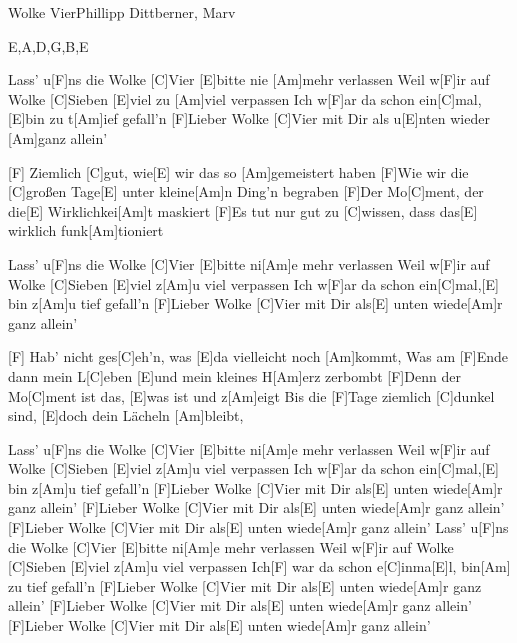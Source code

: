\documentclass[../main.tex]{subfiles}
\begin{document}
\begin{song}[4]{Wolke Vier}{Phillipp Dittberner, Marv}{}
\begin{tabline}{4}{6}{8}{E,A,D,G,B,E}
		\nextbar
		
		\nextbar
		
		\nextbar
		
		\nextbar
\end{tabline}


Lass' u[F]ns die Wolke [C]Vier [E]bitte nie [Am]mehr verlassen
Weil w[F]ir auf Wolke [C]Sieben [E]viel zu [Am]viel verpassen
Ich w[F]ar da schon ein[C]mal, [E]bin zu t[Am]ief gefall'n
[F]Lieber Wolke [C]Vier mit Dir als u[E]nten wieder [Am]ganz allein'

[F] \hh [C] \hh [E] \hh [Am] \hh
[F]Ziemlich [C]gut, wie[E] wir das so [Am]gemeistert haben
[F]Wie wir die [C]großen Tage[E] unter kleine[Am]n Ding'n begraben
[F]Der Mo[C]ment, der die[E] Wirklichkei[Am]t maskiert
[F]Es tut nur gut zu [C]wissen, dass das[E] wirklich funk[Am]tioniert

Lass' u[F]ns die Wolke [C]Vier [E]bitte ni[Am]e mehr verlassen
Weil w[F]ir auf Wolke [C]Sieben [E]viel z[Am]u viel verpassen
Ich w[F]ar da schon ein[C]mal,[E] bin z[Am]u tief gefall'n
[F]Lieber Wolke [C]Vier mit Dir als[E] unten wiede[Am]r ganz allein'

[F] \hh [C] \hh [E] \hh [Am] \hh
[F]Hab' nicht ges[C]eh'n, was [E]da vielleicht noch [Am]kommt,
Was am [F]Ende dann mein L[C]eben [E]und mein kleines H[Am]erz zerbombt
[F]Denn der Mo[C]ment ist das, [E]was ist und z[Am]eigt
Bis die [F]Tage ziemlich [C]dunkel sind, [E]doch dein Lächeln [Am]bleibt,

Lass' u[F]ns die Wolke [C]Vier [E]bitte ni[Am]e mehr verlassen
Weil w[F]ir auf Wolke [C]Sieben [E]viel z[Am]u viel verpassen
Ich w[F]ar da schon ein[C]mal,[E] bin z[Am]u tief gefall'n
[F]Lieber Wolke [C]Vier mit Dir als[E] unten wiede[Am]r ganz allein'
[F]Lieber Wolke [C]Vier mit Dir als[E] unten wiede[Am]r ganz allein'
[F]Lieber Wolke [C]Vier mit Dir als[E] unten wiede[Am]r ganz allein'
Lass' u[F]ns die Wolke [C]Vier [E]bitte ni[Am]e mehr verlassen
Weil w[F]ir auf Wolke [C]Sieben [E]viel z[Am]u viel verpassen
Ich[F] war da schon e[C]inma[E]l, bin[Am] zu tief gefall'n
[F]Lieber Wolke [C]Vier mit Dir als[E] unten wiede[Am]r ganz allein'
[F]Lieber Wolke [C]Vier mit Dir als[E] unten wiede[Am]r ganz allein'
[F]Lieber Wolke [C]Vier mit Dir als[E] unten wiede[Am]r ganz allein'
\end{song}
\end{document}
